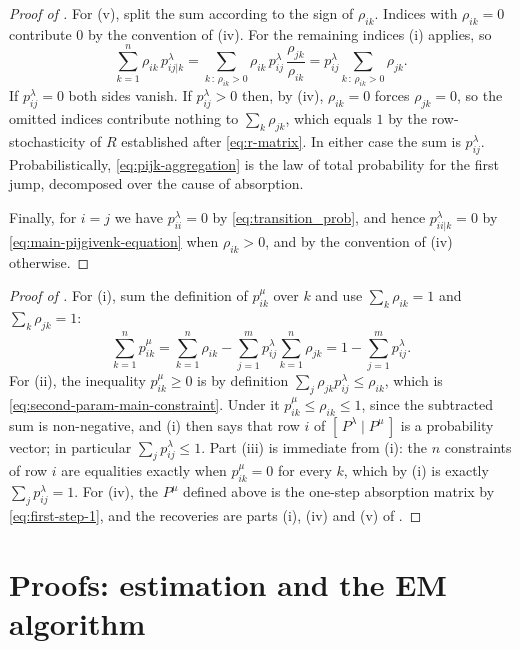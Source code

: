 \documentclass{article}
\begin{document}
\begin{proof}[Proof of ]
For \textup{(v)}, split the sum according to the sign of $\rho_{ik}$. Indices with $\rho_{ik}=0$
contribute $0$ by the convention of \textup{(iv)}. For the remaining indices \textup{(i)} applies, so
\[
\sum_{k=1}^n \rho_{ik}\, p^\lambda_{ij|k}
= \sum_{k \,:\, \rho_{ik}>0} \rho_{ik}\, p^\lambda_{ij}\, \frac{\rho_{jk}}{\rho_{ik}}
= p^\lambda_{ij} \sum_{k \,:\, \rho_{ik}>0} \rho_{jk}.
\]
If $p^\lambda_{ij}=0$ both sides vanish. If $p^\lambda_{ij}>0$ then, by \textup{(iv)}, $\rho_{ik}=0$
forces $\rho_{jk}=0$, so the omitted indices contribute nothing to $\sum_k \rho_{jk}$, which equals
$1$ by the row-stochasticity of $R$ established after \eqref{eq:r-matrix}. In either case the sum is
$p^\lambda_{ij}$. Probabilistically, \eqref{eq:pijk-aggregation} is the law of total probability for
the first jump, decomposed over the cause of absorption.

Finally, for $i=j$ we have $p^\lambda_{ii}=0$ by \eqref{eq:transition_prob}, and hence
$p^\lambda_{ii|k}=0$ by \eqref{eq:main-pijgivenk-equation} when $\rho_{ik}>0$, and by the convention
of \textup{(iv)} otherwise.
\end{proof}

\begin{proof}[Proof of ]
For \textup{(i)}, sum the definition of $p^\mu_{ik}$ over $k$ and use $\sum_k \rho_{ik}=1$ and
$\sum_k \rho_{jk}=1$:
\[
\sum_{k=1}^n p^\mu_{ik}
= \sum_{k=1}^n \rho_{ik} - \sum_{j=1}^m p^\lambda_{ij} \sum_{k=1}^n \rho_{jk}
= 1 - \sum_{j=1}^m p^\lambda_{ij}.
\]
For \textup{(ii)}, the inequality $p^\mu_{ik}\ge0$ is by definition
$\sum_j \rho_{jk}p^\lambda_{ij} \le \rho_{ik}$, which is
\eqref{eq:second-param-main-constraint}. Under it $p^\mu_{ik} \le \rho_{ik} \le 1$, since the
subtracted sum is non-negative, and \textup{(i)} then says that row $i$ of
$[\,P^\lambda \mid P^\mu\,]$ is a probability vector; in particular
$\sum_j p^\lambda_{ij} \le 1$. Part \textup{(iii)} is immediate from \textup{(i)}: the $n$
constraints of row $i$ are equalities exactly when $p^\mu_{ik}=0$ for every $k$, which by
\textup{(i)} is exactly $\sum_j p^\lambda_{ij}=1$. For \textup{(iv)}, the $P^\mu$ defined above is the one-step absorption matrix by
\eqref{eq:first-step-1}, and the recoveries are parts \textup{(i)}, \textup{(iv)} and \textup{(v)} of
.
\end{proof}

\section{Proofs: estimation and the EM algorithm}
\label{app:proofs-est}
\label{app:e-step}
\label{app:e-step-exact}
\end{document}
